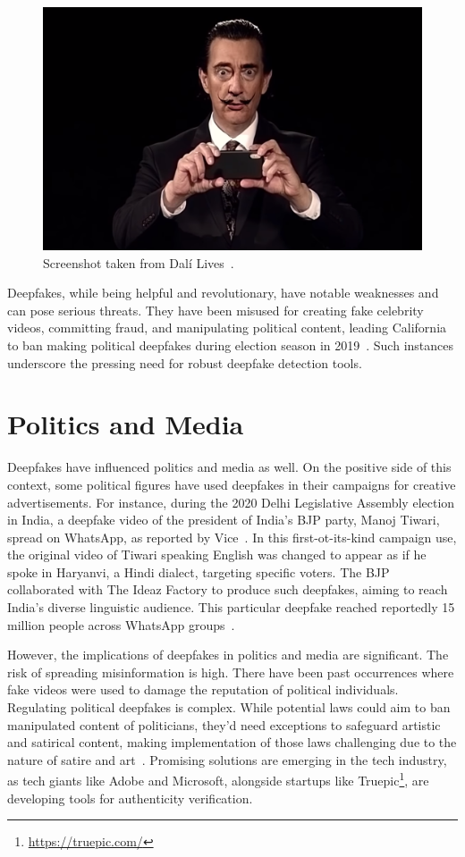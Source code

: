 \begin{figure}[ht]
	\centering
	\includegraphics[width=0.61\columnwidth]{figures/dali}
	\caption{Screenshot taken from Dalí Lives~\cite{salvador-dali-youtube}.}\label{dali-youtube}
\end{figure}

Deepfakes, while being helpful and revolutionary, have notable weaknesses and can pose serious
threats. They have been misused for creating fake celebrity videos, committing fraud, and manipulating
political content, leading California to ban making political deepfakes during election
season in 2019~\cite{salvador-dali,california}. Such instances underscore the pressing need for 
robust deepfake detection tools. 


\section{Politics and Media}
Deepfakes have influenced politics and media as well. On the positive side of this context,
some political figures have used deepfakes in their campaigns for creative advertisements.
For instance, during the 2020 Delhi Legislative Assembly election in India, a deepfake video
of the president of India's \ac{BJP} party, Manoj Tiwari, spread on WhatsApp, as reported
by Vice~\cite{vice}. In this first-ot-its-kind campaign use, the original video of Tiwari speaking
English was changed to appear as if he spoke in Haryanvi, a Hindi dialect, targeting specific
voters. The \ac{BJP} collaborated with The Ideaz Factory to produce such deepfakes, aiming to
reach India's diverse linguistic audience. This particular deepfake reached reportedly 15 million
people across WhatsApp groups~\cite{india}.

However, the implications of deepfakes in politics and
media are significant. The risk of spreading misinformation is high. There have been past
occurrences where fake videos were used to damage the reputation of political individuals.
Regulating political deepfakes is complex. While potential laws could aim to ban manipulated
content of politicians, they'd need exceptions to safeguard artistic and satirical content, 
making implementation of those laws challenging due to the nature of satire and art~\cite{politics,vanity-fair}.
Promising solutions are emerging in the tech industry, as tech giants like Adobe and Microsoft, 
alongside startups like Truepic\footnote{\url{https://truepic.com/}}, are developing tools for 
authenticity verification.